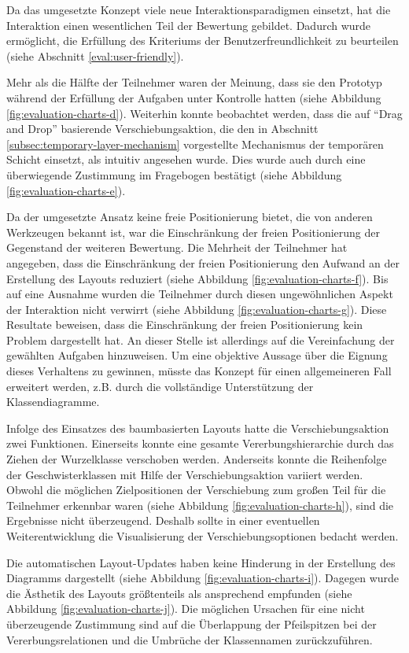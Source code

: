 Da das umgesetzte Konzept viele neue Interaktionsparadigmen einsetzt, hat die Interaktion einen wesentlichen Teil der Bewertung gebildet. Dadurch wurde ermöglicht, die Erfüllung des Kriteriums der Benutzerfreundlichkeit zu beurteilen (siehe Abschnitt \ref{eval:user-friendly}).

Mehr als die Hälfte der Teilnehmer waren der Meinung, dass sie den Prototyp während der Erfüllung der Aufgaben unter Kontrolle hatten (siehe Abbildung \ref{fig:evaluation-charts-d}). Weiterhin konnte beobachtet werden, dass die auf \enquote{Drag and Drop} basierende Verschiebungsaktion, die den in Abschnitt \ref{subsec:temporary-layer-mechanism} vorgestellte Mechanismus der temporären Schicht einsetzt, als intuitiv angesehen wurde. Dies wurde auch durch eine überwiegende Zustimmung im Fragebogen bestätigt (siehe Abbildung \ref{fig:evaluation-charts-e}).

Da der umgesetzte Ansatz keine freie Positionierung bietet, die von anderen Werkzeugen bekannt ist, war die Einschränkung der freien Positionierung der Gegenstand der weiteren Bewertung. Die Mehrheit der Teilnehmer hat angegeben, dass die Einschränkung der freien Positionierung den Aufwand an der Erstellung des Layouts reduziert (siehe Abbildung \ref{fig:evaluation-charts-f}). Bis auf eine Ausnahme wurden die Teilnehmer durch diesen ungewöhnlichen Aspekt der Interaktion nicht verwirrt (siehe Abbildung \ref{fig:evaluation-charts-g}). Diese Resultate beweisen, dass die Einschränkung der freien Positionierung kein Problem dargestellt hat. An dieser Stelle ist allerdings auf die Vereinfachung der gewählten Aufgaben hinzuweisen. Um eine objektive Aussage über die Eignung dieses Verhaltens zu gewinnen, müsste das Konzept für einen allgemeineren Fall erweitert werden, z.B. durch die vollständige Unterstützung der Klassendiagramme.

Infolge des Einsatzes des baumbasierten Layouts hatte die Verschiebungsaktion zwei Funktionen. Einerseits konnte eine gesamte Vererbungshierarchie durch das Ziehen der Wurzelklasse verschoben werden. Anderseits konnte die Reihenfolge der Geschwisterklassen mit Hilfe der Verschiebungsaktion variiert werden. Obwohl die möglichen Zielpositionen der Verschiebung zum großen Teil für die Teilnehmer erkennbar waren (siehe Abbildung \ref{fig:evaluation-charts-h}), sind die Ergebnisse nicht überzeugend. Deshalb sollte in einer eventuellen Weiterentwicklung die Visualisierung der Verschiebungsoptionen bedacht werden.

Die automatischen Layout-Updates haben keine Hinderung in der Erstellung des Diagramms dargestellt (siehe Abbildung \ref{fig:evaluation-charts-i}). Dagegen wurde die Ästhetik des Layouts größtenteils als ansprechend empfunden (siehe Abbildung \ref{fig:evaluation-charts-j}). Die möglichen Ursachen für eine nicht überzeugende Zustimmung sind auf die Überlappung der Pfeilspitzen bei der Vererbungsrelationen und die Umbrüche der Klassennamen zurückzuführen.

